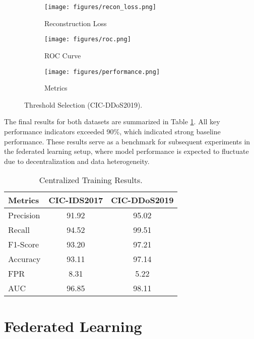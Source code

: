 \begin{figure}[h]
    \centering

    \begin{subfigure}[b]{0.32\textwidth}
        \centering
        \texttt{[image: figures/recon\_loss.png]}
        \caption{Reconstruction Loss}
    \end{subfigure}
    \hfill
    \begin{subfigure}[b]{0.32\textwidth}
        \centering
        \texttt{[image: figures/roc.png]}
        \caption{ROC Curve}
    \end{subfigure}
    \hfill
    \begin{subfigure}[b]{0.32\textwidth}
        \centering
        \texttt{[image: figures/performance.png]}
        \caption{Metrics}
    \end{subfigure}

    \caption{Threshold Selection (CIC-DDoS2019).}
    \label{fig:threshold_selection}
\end{figure}

The final results for both datasets are summarized in Table \ref{tbl:central_train_results}. All key performance indicators exceeded 90\%, which indicated strong baseline performance. These results serve as a benchmark for subsequent experiments in the federated learning setup, where model performance is expected to fluctuate due to decentralization and data heterogeneity.

\begin{table}[h]
    \caption{Centralized Training Results.}
    \centering
    \begin{tabular}{l|c|c}
        Metrics & CIC-IDS2017 & CIC-DDoS2019 \\
        \hline\hline
        Precision & 91.92 & 95.02 \\
        Recall & 94.52 & 99.51 \\
        F1-Score & 93.20 & 97.21 \\
        Accuracy & 93.11 & 97.14 \\
        FPR & 8.31 & 5.22 \\
        AUC & 96.85 & 98.11 \\
    \end{tabular}
    \label{tbl:central_train_results}
\end{table}

\section{Federated Learning}

